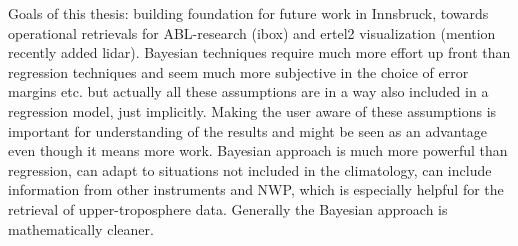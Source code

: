     Goals of this thesis: building foundation for future work in Innsbruck,
    towards operational retrievals for ABL-research (ibox) and ertel2
    visualization (mention recently added lidar). Bayesian techniques require
    much more effort up front than regression techniques and seem much more
    subjective in the choice of error margins etc. but actually all these
    assumptions are in a way also included in a regression model, just
    implicitly. Making the user aware of these assumptions is important for
    understanding of the results and might be seen as an advantage even though
    it means more work. Bayesian approach is much more powerful than
    regression, can adapt to situations not included in the climatology, can
    include information from other instruments and NWP, which is especially
    helpful for the retrieval of upper-troposphere data. Generally the Bayesian
    approach is mathematically cleaner.

\stopsection

